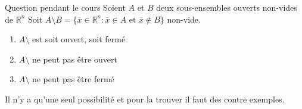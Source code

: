\begin{parag}{Question pendant le cours}
    Soient $A$ et $B$ deux sous-ensembles ouverts non-vides de $ \mathbb{R}^n $ Soit $A \setminus B = \{ \overline{x} \in \mathbb{R}^n : \overline{x} \in A \text{ et } \overline{x} \notin B\} $ non-vide.
    \begin{enumerate}
        $A \setminus B$ peut être ouvert, fermé ou ni ouvert ni fermé
        \item $A \setminus$ est soit ouvert, soit fermé
        \item $A \setminus$ ne peut pas être ouvert
        \item $A \setminus$ ne peut pas être fermé
    \end{enumerate}
    Il n'y a qu'une seul possibilité et pour la trouver il faut des contre exemples.

\end{parag}
